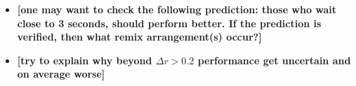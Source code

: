 \begin{itemize}
  \item {\bf [one may want to check the following prediction: those who wait close to 3 seconds, should perform better. If the prediction is verified, then what remix arrangement(s) occur?]}
  \item {\bf [try to explain why beyond $\Delta r > 0.2$ performance get uncertain and on average worse]}
\end{itemize}








%
%
%
%
%
%
%

